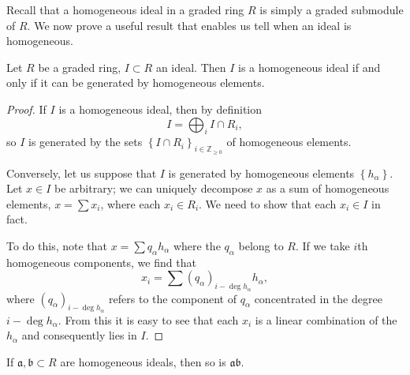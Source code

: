 Recall that a homogeneous ideal in a graded ring $R$ is simply a graded
submodule of $R$. We now prove a useful result that enables us tell when an
ideal is homogeneous.

\begin{proposition} 
Let $R$ be a graded ring, $I \subset R$ an ideal. Then $I$ is a homogeneous
ideal 
if and only if it can be generated by homogeneous elements.
\end{proposition} 
\begin{proof} 
If $I$ is a homogeneous ideal, then by definition
\[ I = \bigoplus_i I \cap R_i,  \]
so $I$ is generated by the sets $\left\{I \cap R_i\right\}_{i \in
\mathbb{Z}_{\geq 0}}$ of homogeneous elements. 

Conversely, let us suppose that $I$ is generated by homogeneous elements
$\left\{h_\alpha\right\}$. Let $x \in I$ be arbitrary; we can uniquely
decompose $x$ as a sum of homogeneous elements, $x = \sum x_i$, where each
$x_i \in R_i$. We need to show that each $x_i \in I$ in fact.

To do this, note that $x = \sum q_\alpha h_\alpha$ where the $q_\alpha $
belong to $R$. If we take $i$th homogeneous components, we find that
\[ x_i = \sum ( q_{\alpha})_{i - \deg h_\alpha} h_\alpha, \]
where $(q_\alpha)_{i - \deg h_\alpha}$ refers to the component of $q_\alpha$
concentrated in the degree $i - \deg h_\alpha$.
From this it is easy to see that each $x_i$ is a linear combination of the
$h_\alpha$ and consequently lies in $I$.
\end{proof} 

\begin{example} 
If $\mathfrak{a}, \mathfrak{b} \subset R$ are homogeneous ideals, then so is
$\mathfrak{a}\mathfrak{b}$.
\end{example} 

